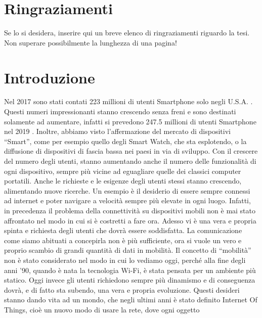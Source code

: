 \chapter*{Ringraziamenti}

Se lo si desidera, inserire qui un breve elenco di ringraziamenti riguardo la tesi.\\

Non superare possibilmente la lunghezza di una pagina! 


\chapter*{Introduzione}


Nel 2017 sono stati contati  223 millioni di utenti Smartphone solo negli U.S.A.
\cite{statista:1}. Questi numeri impressionanti stanno crescendo senza freni e sono destinati
solamente ad aumentare, infatti si prevedono 
247.5 millioni di utenti Smartphone nel 2019 \cite{statista:1}.
Inoltre, abbiamo visto l'affermazione del mercato di dispositivi “Smart”, come per esempio
quello degli Smart Watch, che sta esplotendo, o la
diffusione di dispositivi di fascia bassa nei paesi in via di sviluppo.
Con il crescere del numero degli utenti, stanno aumentando anche il numero delle
funzionalità di ogni dispositivo, sempre più vicine ad eguagliare quelle dei classici
computer portatili. Anche le richieste e le esigenze degli utenti stessi stanno crescendo,
alimentando nuove ricerche. Un esempio è il desiderio di essere sempre connessi
ad internet e poter navigare a velocità sempre più elevate in ogni luogo. Infatti, in
precedenza il problema della connettività su dispositivi mobili non è mai stato affrontato
nel modo in cui si è costretti a fare ora. Adesso vi è una vera e propria spinta
e richiesta degli utenti che dovrà essere soddisfatta. La comunicazione come siamo
abituati a concepirla non è più sufficiente, ora si vuole un vero e proprio scambio di
grandi quantità di dati in mobilità. Il concetto di “mobilità” non è stato considerato
nel modo in cui lo vediamo oggi, perché alla fine degli anni ’90, quando è nata la
tecnologia Wi-Fi, è stata pensata per un ambiente più statico. Oggi invece gli utenti
richiedono sempre più dinamismo e di conseguenza dovrà, e di fatto sta subendo,
una vera e propria evoluzione.
Questi desideri stanno dando vita ad un mondo, che negli ultimi anni è stato
definito Internet Of Things, cioè un nuovo modo di usare la rete, dove ogni oggetto

